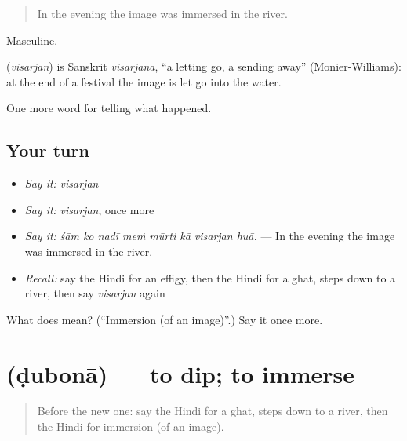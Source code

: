 \begin{quote}
In the evening the image was immersed in the river.
\end{quote}

Masculine.

\begin{cousinweb}
\textbf{} (\emph{visarjan}) is Sanskrit \emph{visarjana}, \textquotedblleft{}a letting go, a sending away\textquotedblright{} (Monier-Williams): at the end of a festival the image is let go into the water.
\end{cousinweb}

\begin{grammarlens}[title={What you've built}]
One more word for telling what happened.
\end{grammarlens}

\subsection*{Your turn}
\begin{itemize}
\raggedright
  \item \emph{Say it:} \emph{visarjan}
  \item \emph{Say it:} \emph{visarjan}, once more
  \item \emph{Say it:} \emph{śām ko nadī meṁ mūrti kā visarjan huā.} — In the evening the image was immersed in the river.
  \item \emph{Recall:} say the Hindi for an effigy, then the Hindi for a ghat, steps down to a river, then say \emph{visarjan} again
\end{itemize}

\begin{tcolorbox}[breakable,colback=teal!4,colframe=teal!35!black,title={Before you move on}]
What does  mean? (\textquotedblleft{}Immersion (of an image)\textquotedblright{}.) Say it once more.
\end{tcolorbox}
\section[\texorpdfstring{\hi{डुबोना} (ḍubonā)}{डुबोना (ḍubonā)}]{ (ḍubonā) — to dip; to immerse}

\label{lesson:HI-C333-dubona}



\begin{quote}
Before the new one: say the Hindi for a ghat, steps down to a river, then the Hindi for immersion (of an image).
\end{quote}

